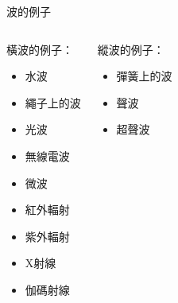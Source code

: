 \documentclass[13pt]{beamer}
\begin{document}
\begin{frame}{波的例子}
    \begin{columns}


        \begin{exampleblock}
            {橫波的例子：}
            \begin{itemize}
                \item 水波
                \item 繩子上的波
                \item 光波
                \item 無線電波
                \item 微波
                \item 紅外輻射
                \item 紫外輻射
                \item X射線
                \item 伽碼射線
            \end{itemize}
        \end{exampleblock}
        \begin{exampleblock}
            {縱波的例子：}
            \begin{itemize}
                \item 彈簧上的波
                \item 聲波
                \item 超聲波
            \end{itemize}
        \end{exampleblock}

    \end{columns}


\end{frame}

\end{document}
